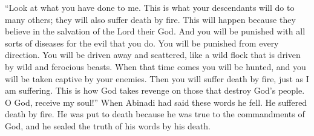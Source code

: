 ``Look at what you have done to me. This is what your descendants will do to many others; they will also suffer death by fire. This will happen because they believe in the salvation of the Lord their God.
\bverse \iffalse And it will come to pass that ye shall be afflicted with all manner of diseases because of your iniquities. \fi
And you will be punished with all sorts of diseases for the evil that you do.
\bverse \iffalse Yea, and ye shall be smitten on every hand, and shall be driven and scattered to and fro, even as a wild flock is driven by wild and ferocious beasts. \fi
You will be punished from every direction. You will be driven away and scattered, like a wild flock that is driven by wild and ferocious beasts.
\bverse \iffalse And in that day ye shall be hunted, and ye shall be taken by the hand of your enemies, and then ye shall suffer, as I suffer, the pains of death by fire. \fi
When that time comes you will be hunted, and you will be taken captive by your enemies. Then you will suffer death by fire, just as I am suffering.
\bverse \iffalse Thus God executeth vengeance upon those that destroy his people. O God, receive my soul. \fi
This is how God takes revenge on those that destroy God's people. O God, receive my soul!''
\bverse \iffalse And now, when Abinadi had said these words, he fell, having suffered death by fire; yea, having been put to death because he would not deny the commandments of God, having sealed the truth of his words by his death. \fi
When Abinadi had said these words he fell. He suffered death by fire. He was put to death because he was true to the commandments of God, and he sealed the truth of his words by his death.

